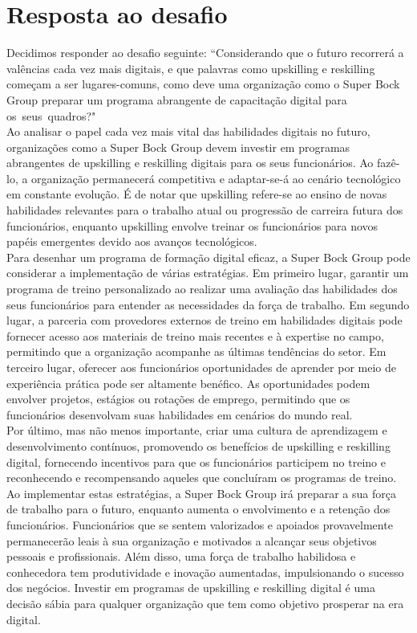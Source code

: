 \chapter{Resposta ao desafio}
\label{Chapter4} %
Decidimos responder ao desafio seguinte: “Considerando que o futuro recorrerá a valências cada vez mais digitais, e que palavras como upskilling e reskilling começam a ser lugares-comuns, como deve uma organização como o Super Bock Group preparar um programa abrangente de capacitação digital para os seus quadros?"\\

Ao analisar o papel cada vez mais vital das habilidades digitais no futuro, organizações como a Super Bock Group devem investir em programas abrangentes de upskilling e reskilling digitais para os seus funcionários. Ao fazê-lo, a organização permanecerá competitiva e adaptar-se-á ao cenário tecnológico em constante evolução. É de notar que upskilling refere-se ao ensino de novas habilidades relevantes para o trabalho atual ou progressão de carreira futura dos funcionários, enquanto upskilling envolve treinar os funcionários para novos papéis emergentes devido aos avanços tecnológicos.\\

Para desenhar um programa de formação digital eficaz, a Super Bock Group pode considerar a implementação de várias estratégias. Em primeiro lugar, garantir um programa de treino personalizado ao realizar uma avaliação das habilidades dos seus funcionários para entender as necessidades da força de trabalho. Em segundo lugar, a parceria com provedores externos de treino em habilidades digitais pode fornecer acesso aos materiais de treino mais recentes e à expertise no campo, permitindo que a organização acompanhe as últimas tendências do setor. Em terceiro lugar, oferecer aos funcionários oportunidades de aprender por meio de experiência prática pode ser altamente benéfico. As oportunidades podem envolver projetos, estágios ou rotações de emprego, permitindo que os funcionários desenvolvam suas habilidades em cenários do mundo real.\\

Por último, mas não menos importante, criar uma cultura de aprendizagem e desenvolvimento contínuos, promovendo os benefícios de upskilling e reskilling digital, fornecendo incentivos para que os funcionários participem no treino e reconhecendo e recompensando aqueles que concluíram os programas de treino. Ao implementar estas estratégias, a Super Bock Group irá preparar a sua força de trabalho para o futuro, enquanto aumenta o envolvimento e a retenção dos funcionários. Funcionários que se sentem valorizados e apoiados provavelmente permanecerão leais à sua organização e motivados a alcançar seus objetivos pessoais e profissionais. Além disso, uma força de trabalho habilidosa e conhecedora tem produtividade e inovação aumentadas, impulsionando o sucesso dos negócios. Investir em programas de upskilling e reskilling digital é uma decisão sábia para qualquer organização que tem como objetivo prosperar na era digital.
